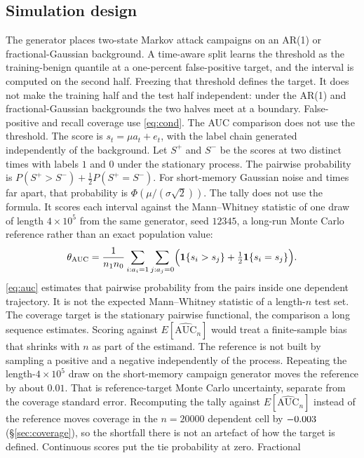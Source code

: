 \documentclass[a4paper,fleqn]{cas-dc}
\begin{document}
\subsection{Simulation design}
The generator places two-state Markov attack campaigns on an AR(1) or fractional-Gaussian
background. A time-aware split learns the threshold as the training-benign quantile at a one-percent
false-positive target, and the interval is computed on the second half. Freezing that threshold
defines the target. It does not make the training half and the test half independent: under the
AR(1) and fractional-Gaussian backgrounds the two halves meet at a boundary. False-positive and
recall coverage use \eqref{eq:cond}. The AUC comparison does not use the threshold. The score is
$s_t=\mu a_t+e_t$, with the label chain generated independently of the background. Let $S^{+}$ and
$S^{-}$ be the scores at two distinct times with labels $1$ and $0$ under the stationary process.
The pairwise probability is $P(S^{+}>S^{-})+\tfrac12 P(S^{+}=S^{-})$. For short-memory Gaussian
noise and times far apart, that probability is $\Phi(\mu/(\sigma\sqrt{2}))$. The tally does not use
the formula. It scores each interval against the Mann--Whitney statistic of one draw of length
$4\times10^{5}$ from the same generator, seed $12345$, a long-run Monte Carlo reference rather than
an exact population value:
\begin{equation}
\theta_{\mathrm{AUC}}
=\frac{1}{n_1 n_0}\sum_{i:a_i=1}\sum_{j:a_j=0}
\Bigl(\mathbf{1}\{s_i>s_j\}+\tfrac12\mathbf{1}\{s_i=s_j\}\Bigr).
\label{eq:auc}
\end{equation}
\eqref{eq:auc} estimates that pairwise probability from the pairs inside one dependent trajectory.
It is not the expected Mann--Whitney statistic of a length-$n$ test set. The coverage target is
the stationary pairwise functional, the comparison a long sequence estimates. Scoring against
$E[\widehat{\mathrm{AUC}}_n]$ would treat a finite-sample bias that shrinks with $n$ as part of
the estimand. The reference is not built by sampling a positive and a negative independently of
the process. Repeating the length-$4\times10^{5}$ draw on the short-memory campaign generator
moves the reference by about $0.01$. That is reference-target Monte Carlo uncertainty, separate
from the coverage standard error. Recomputing the tally against $E[\widehat{\mathrm{AUC}}_n]$
instead of the reference moves coverage in the $n{=}20000$ dependent cell by $-0.003$
(\S\ref{sec:coverage}), so the shortfall there is not an artefact of how the target is defined.
Continuous scores put the tie probability at zero. Fractional
\end{document}
